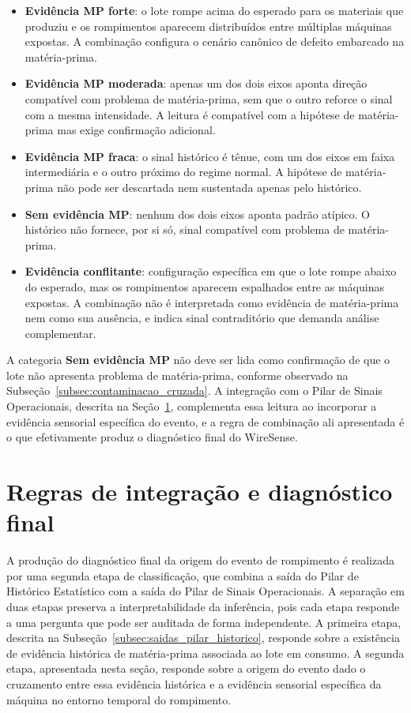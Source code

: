 \begin{itemize}
    \item \textbf{Evidência MP forte}: o lote rompe acima do esperado para os materiais que produziu e os rompimentos aparecem distribuídos entre múltiplas máquinas expostas. A combinação configura o cenário canônico de defeito embarcado na matéria-prima.
    \item \textbf{Evidência MP moderada}: apenas um dos dois eixos aponta direção compatível com problema de matéria-prima, sem que o outro reforce o sinal com a mesma intensidade. A leitura é compatível com a hipótese de matéria-prima mas exige confirmação adicional.
    \item \textbf{Evidência MP fraca}: o sinal histórico é tênue, com um dos eixos em faixa intermediária e o outro próximo do regime normal. A hipótese de matéria-prima não pode ser descartada nem sustentada apenas pelo histórico.
    \item \textbf{Sem evidência MP}: nenhum dos dois eixos aponta padrão atípico. O histórico não fornece, por si só, sinal compatível com problema de matéria-prima.
    \item \textbf{Evidência conflitante}: configuração específica em que o lote rompe abaixo do esperado, mas os rompimentos aparecem espalhados entre as máquinas expostas. A combinação não é interpretada como evidência de matéria-prima nem como sua ausência, e indica sinal contraditório que demanda análise complementar.
\end{itemize}

A categoria \textbf{Sem evidência MP} não deve ser lida como confirmação de que o lote não apresenta problema de matéria-prima, conforme observado na Subseção~\ref{subsec:contaminacao_cruzada}. A integração com o Pilar de Sinais Operacionais, descrita na Seção~\ref{sec:regras_integracao}, complementa essa leitura ao incorporar a evidência sensorial específica do evento, e a regra de combinação ali apresentada é o que efetivamente produz o diagnóstico final do WireSense.


\section{Regras de integração e diagnóstico final}
\label{sec:regras_integracao}

A produção do diagnóstico final da origem do evento de rompimento é realizada por uma segunda etapa de classificação, que combina a saída do Pilar de Histórico Estatístico com a saída do Pilar de Sinais Operacionais. A separação em duas etapas preserva a interpretabilidade da inferência, pois cada etapa responde a uma pergunta que pode ser auditada de forma independente. A primeira etapa, descrita na Subseção~\ref{subsec:saidas_pilar_historico}, responde sobre a existência de evidência histórica de matéria-prima associada ao lote em consumo. A segunda etapa, apresentada nesta seção, responde sobre a origem do evento dado o cruzamento entre essa evidência histórica e a evidência sensorial específica da máquina no entorno temporal do rompimento.

